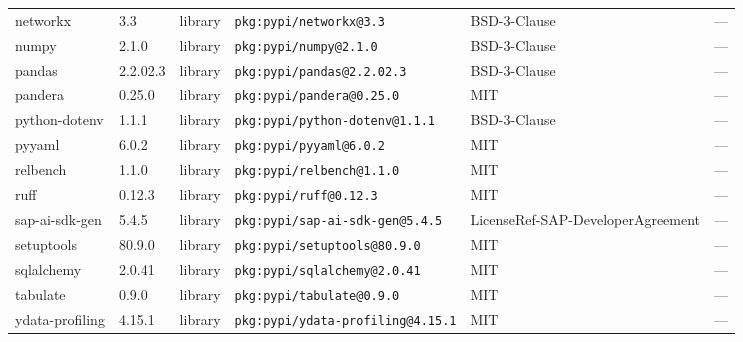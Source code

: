 \documentclass[11pt,a4paper]{article}
\begin{document}
\begin{longtable}{|p{4cm}|p{2cm}|p{1.6cm}|p{5cm}|p{1.5cm}|p{3.5cm}|}
\raggedright networkx & 3.3 & library & \small\texttt{pkg:pypi/networkx@3.3} & BSD-3-Clause & \small — \\
\raggedright numpy & 2.1.0 & library & \small\texttt{pkg:pypi/numpy@2.1.0} & BSD-3-Clause & \small — \\
\raggedright pandas & 2.2.02.3 & library & \small\texttt{pkg:pypi/pandas@2.2.02.3} & BSD-3-Clause & \small — \\
\raggedright pandera & 0.25.0 & library & \small\texttt{pkg:pypi/pandera@0.25.0} & MIT & \small — \\
\raggedright python-dotenv & 1.1.1 & library & \small\texttt{pkg:pypi/python-dotenv@1.1.1} & BSD-3-Clause & \small — \\
\raggedright pyyaml & 6.0.2 & library & \small\texttt{pkg:pypi/pyyaml@6.0.2} & MIT & \small — \\
\raggedright relbench & 1.1.0 & library & \small\texttt{pkg:pypi/relbench@1.1.0} & MIT & \small — \\
\raggedright ruff & 0.12.3 & library & \small\texttt{pkg:pypi/ruff@0.12.3} & MIT & \small — \\
\raggedright sap-ai-sdk-gen & 5.4.5 & library & \small\texttt{pkg:pypi/sap-ai-sdk-gen@5.4.5} & LicenseRef-SAP-DeveloperAgreement & \small — \\
\raggedright setuptools & 80.9.0 & library & \small\texttt{pkg:pypi/setuptools@80.9.0} & MIT & \small — \\
\raggedright sqlalchemy & 2.0.41 & library & \small\texttt{pkg:pypi/sqlalchemy@2.0.41} & MIT & \small — \\
\raggedright tabulate & 0.9.0 & library & \small\texttt{pkg:pypi/tabulate@0.9.0} & MIT & \small — \\
\raggedright ydata-profiling & 4.15.1 & library & \small\texttt{pkg:pypi/ydata-profiling@4.15.1} & MIT & \small — \\
\end{longtable}
\end{document}
